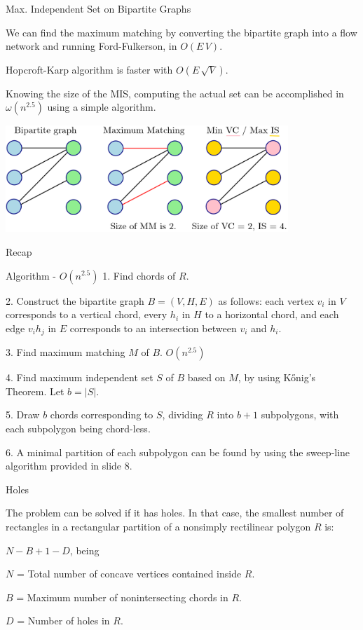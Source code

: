 \documentclass{beamer}
\begin{document}
\begin{frame}[t, shrink=10]{Max. Independent Set on Bipartite Graphs}

We can find the maximum matching by converting the bipartite graph into a flow network and running Ford-Fulkerson, in $O(E\, V)$. 

Hopcroft-Karp algorithm is faster with $O(E\, \sqrt{V})$.

	Knowing the size of the MIS, computing the actual set can be accomplished in $\omega(n^{2.5})$ using a simple algorithm.
	\vspace{10px}

	\centering
    \includegraphics[width=0.8\textwidth]{mis.png}


\end{frame}

\begin{frame}[t, shrink=10]{Recap}

	\begin{block}{Algorithm - $O(n^{2.5})$}
	1. Find chords of $R$.
	
	2. Construct the bipartite graph $B = (V, H, E)$ as follows: each vertex $v_i$ in $V$ corresponds to a vertical chord, every $h_i$ in $H$ to a horizontal chord, and each edge $v_i h_j$ in $E$ corresponds to an intersection between $v_i$ and $h_i$.

	3. Find maximum matching $M$ of $B$. $O(n^{2.5})$
	
	4. Find maximum independent set $S$ of $B$ based on $M$, by using Kőnig's Theorem. Let $b = |S|$.

	5. Draw $b$ chords corresponding to $S$, dividing $R$ into $b + 1$ subpolygons, with each subpolygon being chord-less.
	
	6. A minimal partition of each subpolygon can be found by using the sweep-line algorithm provided in slide 8.
		\end{block}
\end{frame}


\begin{frame}[t]{Holes}

	The problem can be solved if it has holes. In that case, the smallest number of rectangles in a rectangular partition of a nonsimply rectilinear polygon $R$ is:

	\begin{center}
		$N - B + 1 - D$, being 
	\end{center}
	
	$N$ = Total number of concave vertices contained inside $R$. 

	$B$ = Maximum number of nonintersecting chords in $R$. 

	$D$ = Number of holes in $R$. 

\end{frame}
\end{document}
